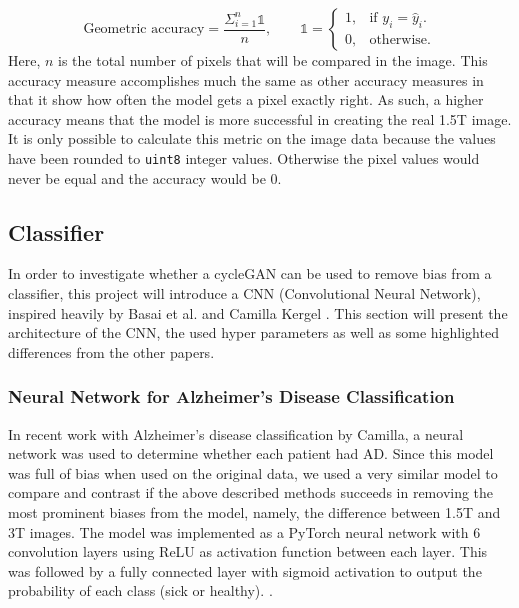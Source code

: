 \documentclass[12pt, fleqn, titlepage]{article}
\newcommand{\1}[1]{\mathds{1}\left[#1\right]}
\begin{document}
\begin{equation}
	\textrm{Geometric accuracy} = \frac{\Sigma_{i=1}^{n}\mathds{1}}{n}, \qquad
	  \mathds{1}=\begin{cases} 1, & \text{if $y_i = \hat{y}_i$}.\\ 0, & \text{otherwise}.\end{cases}
\end{equation}
Here, $n$ is the total number of pixels that will be compared in the image. This accuracy measure accomplishes much the same as other accuracy measures in that it show how often the model gets a pixel exactly right. As such, a higher accuracy means that the model is more successful in creating the real 1.5T image. It is only possible to calculate this metric on the image data because the values have been rounded to \texttt{uint8} integer values. Otherwise the pixel values would never be equal and the accuracy would be 0.


\subsection{Classifier}

In order to investigate whether a cycleGAN can be used to remove bias from a classifier, this project will introduce a CNN (Convolutional Neural Network), inspired heavily by Basai et al. and Camilla Kergel \cite{CamillaKandidat} \cite{neuro}. This section will present the architecture of the CNN, the used hyper parameters as well as some highlighted differences from the other papers.

\subsubsection{Neural Network for Alzheimer's Disease Classification} \label{camillas_model}
In recent work with Alzheimer's disease classification by Camilla, a neural network was used to determine whether each patient had AD. Since this model was full of bias when used on the original data, we used a very similar model to compare and contrast if the above described methods succeeds in removing the most prominent biases from the model, namely, the difference between 1.5T and 3T images. The model was implemented as a PyTorch neural network with 6 convolution layers using ReLU as activation function between each layer. This was followed by a fully connected layer with sigmoid activation to output the probability of each class (sick or healthy).  \cite{CamillaKandidat}.
\end{document}
